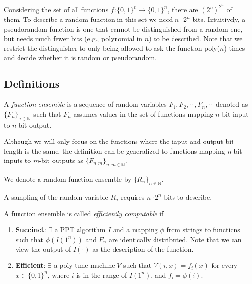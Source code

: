 \documentclass[12pt]{tufte-book}
\begin{document}
Considering the set of all functions $f: \{0, 1\}^n \rightarrow \{0, 1\}^n$, there are $(2^n)^{2^n}$ of them.
To describe a random function in this set we need $n \cdot 2^n$ bits.
Intuitively, a pseudorandom function is one that cannot be distinguished from a random one,
but needs much fewer bits (e.g., polynomial in $n$) to be described.
Note that we restrict the distinguisher to only being allowed to ask the function poly($n$) times and decide whether it is random or pseudorandom.

\subsection{Definitions}

\begin{definition}
    A \emph{function ensemble} is a sequence of random variables $F_1, F_2, \cdots, F_n, \cdots$ denoted as $\{F_n\}_{n \in \mathbb{N}}$ such that
    $F_n$ assumes values in the set of functions mapping $n$-bit input to $n$-bit output.
\end{definition}
Although we will only focus on the functions where the input and output bit-length is the same, the definition can be generalized to functions mapping $n$-bit inputs to $m$-bit outputs as $\{F_{n, m}\}_{n, m \in \mathbb{N}}$.

\begin{definition}
    We denote a random function ensemble by $\{R_n\}_{n \in \mathbb{N}}$.
\end{definition}
A sampling of the random variable $R_n$ requires $n \cdot 2^n$ bits to describe.

\begin{definition}
    A function ensemble is called \emph{efficiently computable} if
    \begin{enumerate}[label=(\alph*)]
        \item \textbf{Succinct}:
              $\exists$ a PPT algorithm $I$ and a mapping $\phi$ from strings to functions such that
              $\phi(I(1^n))$ and $F_n$ are identically distributed.
              Note that we can view the output of $I(\cdot)$ as the description of the function.
        \item \textbf{Efficient}:
              $\exists$ a poly-time machine $V$ such that
              $V(i, x) = f_i(x)$ for every $x \in \{0, 1\}^n$, where $i$ is in the range of $I(1^n)$, and $f_i = \phi(i)$.
    \end{enumerate}
\end{definition}
\end{document}
